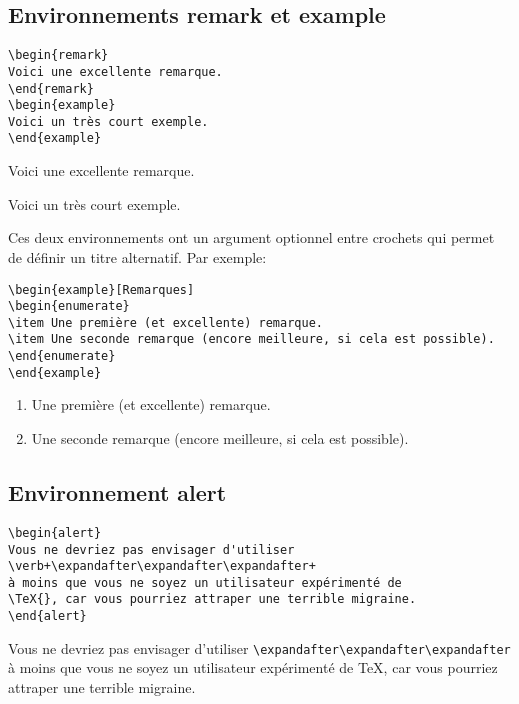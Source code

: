 \documentclass[french,ColorTheme=USAF,FontSize=10pt]{tango}
\begin{document}
\subsection{Environnements remark et example}
\begin{tcolorbox}
\begin{verbatim}
\begin{remark} 
Voici une excellente remarque.
\end{remark}
\begin{example} 
Voici un très court exemple.
\end{example}
\end{verbatim}
\end{tcolorbox}
\begin{remark} 
Voici une excellente remarque.
\end{remark}
\begin{example} 
Voici un très court exemple.
\end{example}

Ces deux environnements ont un argument optionnel entre crochets qui permet de définir un titre alternatif. Par exemple:
\begin{tcolorbox}
\begin{verbatim}
\begin{example}[Remarques]
\begin{enumerate}
\item Une première (et excellente) remarque.
\item Une seconde remarque (encore meilleure, si cela est possible).
\end{enumerate}
\end{example}
\end{verbatim}
\end{tcolorbox}
\begin{example}[Remarques]
\begin{enumerate}
\item Une première (et excellente) remarque.
\item Une seconde remarque (encore meilleure, si cela est possible).
\end{enumerate}
\end{example}

\subsection{Environnement  alert}
\begin{tcolorbox}
\begin{verbatim}
\begin{alert}
Vous ne devriez pas envisager d'utiliser 
\verb+\expandafter\expandafter\expandafter+
à moins que vous ne soyez un utilisateur expérimenté de
\TeX{}, car vous pourriez attraper une terrible migraine.
\end{alert}
\end{verbatim}
\end{tcolorbox}
\begin{alert}
Vous ne devriez pas envisager d'utiliser \verb+\expandafter\expandafter\expandafter+
à moins que vous ne soyez un utilisateur expérimenté de  \TeX{}, car vous pourriez attraper une terrible migraine.
\end{alert}
\end{document}
